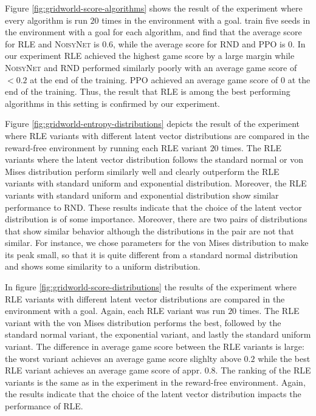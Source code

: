 \documentclass[10pt]{article} %
\begin{document}
Figure \ref{fig:gridworld-score-algorithms} shows the result of the experiment where every algorithm is run $20$ times in the environment with a goal. \cite{rle-paper} train five seeds in the environment with a goal for each algorithm, and find that the average score for \textsc{RLE} and \textsc{NoisyNet} is $0.6$, while the average score for \textsc{RND} and \textsc{PPO} is $0$. In our experiment \textsc{RLE} achieved the highest game score by a large margin while \textsc{NoisyNet} and \textsc{RND} performed similarly poorly with an average game score of $<0.2$ at the end of the training. \textsc{PPO} achieved an average game score of $0$ at the end of the training. Thus, the result that \textsc{RLE} is among the best performing algorithms in this setting is confirmed by our experiment.

Figure \ref{fig:gridworld-entropy-distributions} depicts the result of the experiment where \textsc{RLE} variants with different latent vector distributions are compared in the reward-free environment by running each \textsc{RLE} variant $20$ times. The \textsc{RLE} variants where the latent vector distribution follows the standard normal or von Mises distribution perform similarly well and clearly outperform the \textsc{RLE} variants with standard uniform and exponential distribution. Moreover, the \textsc{RLE} variants with standard uniform and exponential distribution show similar performance to \textsc{RND}. These results indicate that the choice of the latent vector distribution is of some importance. Moreover, there are two pairs of distributions that show similar behavior although the distributions in the pair are not that similar. For instance, we chose parameters for the von Mises distribution to make its peak small, so that it is quite different from a standard normal distribution and shows some similarity to a uniform distribution. 

In figure \ref{fig:gridworld-score-distributions} the results of the experiment where \textsc{RLE} variants with different latent vector distributions are compared in the environment with a goal. Again, each \textsc{RLE} variant was run $20$ times. The \textsc{RLE} variant with the von Mises distribution performs the best, followed by the standard normal variant, the exponential variant, and lastly the standard uniform variant. The difference in average game score between the \textsc{RLE} variants is large: the worst variant achieves an average game score slighlty above $0.2$ while the best \textsc{RLE} variant achieves an average game score of appr. $0.8$. The ranking of the \textsc{RLE} variants is the same as in the experiment in the reward-free environment. Again, the results indicate that the choice of the latent vector distribution impacts the performance of \textsc{RLE}.
\end{document}

